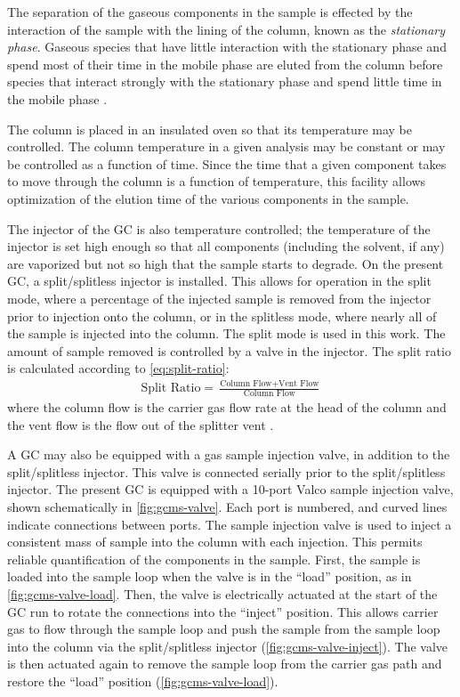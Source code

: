 \documentclass[../main.tex]{subfiles}
\begin{document}
The separation of the gaseous components in the sample is effected by
the interaction of the sample with the lining of the column, known as the
\textit{stationary phase}. Gaseous species that have little interaction with
the stationary phase and spend most of their time in the mobile phase
are eluted from the column before species that interact strongly with
the stationary phase and spend little time in the mobile phase \cite{Sparkman2011a}.

The column is placed in an insulated oven so that its temperature may be
controlled. The column temperature in a given analysis may be constant
or may be controlled as a function of time. Since the time that a given
component takes to move through the column is a function of temperature,
this facility allows optimization of the elution time of the various
components in the sample.

The injector of the GC is also temperature controlled; the temperature of
the injector is set high enough so that all components (including the solvent,
if any) are vaporized but not so high that the sample starts to degrade. On the present GC,
a split/splitless injector is installed. This allows for operation in the
split mode, where a percentage of the injected sample is removed from the
injector prior to injection onto the column, or in the splitless mode,
where nearly all of the sample is injected into the column. The split mode
is used in this work. The amount of sample removed is controlled by a valve
in the injector. The split ratio is calculated according to \cref{eq:split-ratio}:
%
\begin{gather}
\label{eq:split-ratio}
\text{Split Ratio} = \frac{\text{Column Flow} +\text{Vent Flow}}{\text{Column Flow}}
\end{gather}
%
where the column flow is the carrier gas flow rate at the head of the column
and the vent flow is the flow out of the splitter vent \cite{Sparkman2011a}.

A GC may also be equipped with a gas sample injection valve, in addition to the
split/splitless injector. This valve is connected serially prior to the
split/splitless injector. The present GC is equipped with a 10-port Valco sample
injection valve, shown schematically in \cref{fig:gcms-valve}.
Each port is numbered, and curved lines indicate connections between ports.
The sample injection valve is used to inject a consistent mass of sample into the column
with each injection. This permits reliable quantification of the
components in the sample. First, the sample is loaded into the sample loop
when the valve is in the ``load'' position, as in \cref{fig:gcms-valve-load}.
Then, the valve is electrically actuated at the start of the
GC run to rotate the connections into the
``inject'' position. This allows carrier gas to flow through the sample loop and push
the sample from the sample loop into the column via the split/splitless injector (\cref{fig:gcms-valve-inject}).
The valve is then actuated again to remove the sample loop
from the carrier gas path and restore the ``load'' position (\cref{fig:gcms-valve-load}).
\end{document}
